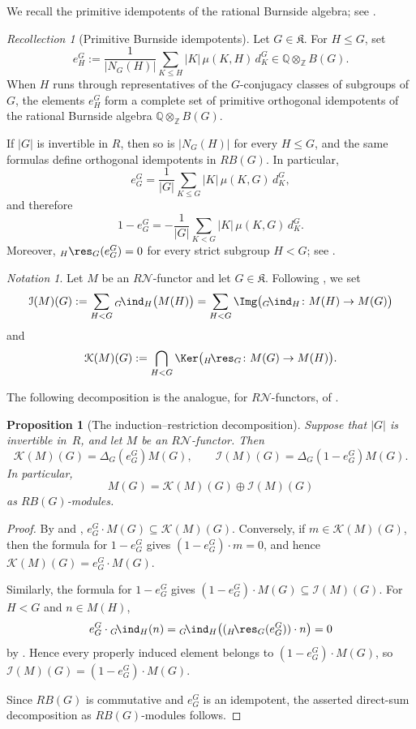 \documentclass{amsart}
\numberwithin{equation}{section}%
\newtheorem{Prop}[equation]{Proposition}
\theoremstyle{remark}
\newtheorem{Not}[equation]{Notation}
\newtheorem{Rec}[equation]{Recollection}
\theoremstyle{definition}
\newcommand{\cI}{\mathcal I}
\newcommand{\cK}{\mathcal K}
\newcommand{\n}{\mathcal N}
\newcommand{\lind}[1]{{}_{#1}\!\ind}
\newcommand{\lres}[1]{{}_{#1}\!\res}
\begin{document}
We recall the primitive idempotents of the rational Burnside algebra;
see \cite[Remark~2.5]{Boltje98a}.
%
\begin{Rec}[Primitive Burnside idempotents]
\label{rec:primitive-Burnside-idempotents}
Let $G\in\mathfrak K$.  For $H\leq G$, set
%
\[
e_H^G
:=
\frac{1}{|N_G(H)|}
\sum_{K\leq H}
|K|\,\mu(K,H)\,d_K^G
\in
\mathbb Q\otimes_{\mathbb Z}B(G).
\]
%
When $H$ runs through representatives of the $G$-conjugacy
classes of subgroups of~$G$, the elements $e_H^G$ form a complete
set of primitive orthogonal idempotents of the rational Burnside
algebra $\mathbb Q\otimes_{\mathbb Z}B(G)$.

If $|G|$ is invertible in $R$, then so is $|N_G(H)|$ for every
$H\leq G$, and the same formulas define orthogonal idempotents
in $RB(G)$.  In particular,
%
\[
e_G^G
=
\frac{1}{|G|}
\sum_{K\leq G}
|K|\,\mu(K,G)\,d_K^G,
\]
%
and therefore
%
\[
1-e_G^G
=
-\frac{1}{|G|}
\sum_{K<G}
|K|\,\mu(K,G)\,d_K^G.
\]
%
Moreover, ${}_H\res_G(e_G^G)=0$ for every strict subgroup
$H<G$; see \cite[proof of Proposition~6.2]{Boltje98a}.
\end{Rec}
%
\begin{Not}
\label{not:induction-restriction-submodules}
Let $M$ be an $R\n$-functor and let $G\in\mathfrak K$.  
Following \cite[Subsec.~1.6--1.7]{Boltje98a}, we set
%
\[
\cI(M)(G)
:=
\sum_{H<G}
{}\lind{G}_H\bigl(M(H)\bigr)
=
\sum_{H<G}
\Img
\bigl({}\lind{G}_H\colon M(H)\to M(G)\bigr)
\]
%
and
%
\[
\cK(M)(G)
:=
\bigcap_{H<G}
\Ker
\bigl({}\lres{H}_G\colon M(G)\to M(H)\bigr).
\]
\end{Not}
%
The following decomposition is the analogue, for $R\n$-functors, of
\cite[Proposition~6.2]{Boltje98a}.
%
\begin{Prop}[The induction--restriction decomposition]
\label{prop:Burnside-decomposition}
Suppose that $|G|$ is invertible in~$R$, and let $M$ be an
$R\n$-functor.  Then
%
\[
\cK(M)(G)
=
\Delta_G(e_G^G)M(G),
\qquad
\cI(M)(G)
=
\Delta_G(1-e_G^G)M(G).
\]
%
In particular,
%
\[
M(G)
=
\cK(M)(G)\oplus\cI(M)(G)
\]
%
as $RB(G)$-modules.
\end{Prop}
%
\begin{proof}
By  and
,
$e_G^G\cdot M(G)\subseteq\cK(M)(G)$.
Conversely, if $m\in\cK(M)(G)$, then the formula for $1-e_G^G$ gives
$(1-e_G^G)\cdot m=0$, and hence
$\cK(M)(G)=e_G^G\cdot M(G)$.

Similarly, the formula for $1-e_G^G$ gives
$(1-e_G^G)\cdot M(G)\subseteq\cI(M)(G)$.
For $H<G$ and $n\in M(H)$,
%
\[
e_G^G\cdot{}\lind{G}_H(n)
=
{}\lind{G}_H
\bigl(({}\lres{H}_G(e_G^G))\cdot n\bigr)
=
0
\]
%
by .
Hence every properly induced element belongs to
$(1-e_G^G)\cdot M(G)$, so
$\cI(M)(G)=(1-e_G^G)\cdot M(G)$.

Since $RB(G)$ is commutative and $e_G^G$ is an idempotent, the asserted
direct-sum decomposition as $RB(G)$-modules follows.
\end{proof}
\end{document}
